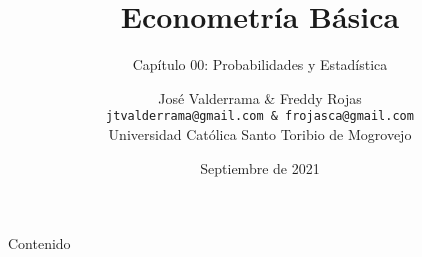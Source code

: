 \documentclass{beamer}
\title[Capítulo 00]{Econometría Básica}
\subtitle{Capítulo 00: Probabilidades y Estadística}
\author[José V. \& Freddy R.]{José Valderrama \& Freddy Rojas \\
	\texttt{jtvalderrama@gmail.com \& frojasca@gmail.com} \\
	Universidad Católica Santo Toribio de Mogrovejo}
\date[Septiembre de 2021]{Septiembre de 2021}
\begin{document}
	\rmfamily
		\begin{frame}
			\maketitle
		\end{frame}

	\begin{frame}{Contenido}
		\tableofcontents
	\end{frame}

	
	

	\begin{frame}
		\maketitle
	\end{frame}
\end{document}
